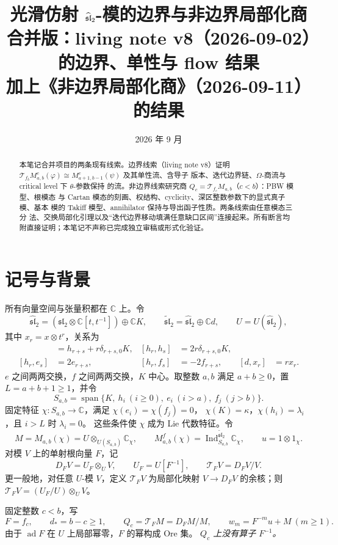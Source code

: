 \documentclass[UTF8,11pt]{ctexart}
\title{光滑仿射 \(\slh\)-模的边界与非边界局部化商\\
\large 合并版：living note v8（2026-09-02）的边界、单性与 flow 结果\\
加上《非边界局部化商》（2026-09-11）的结果}
\author{}
\date{2026 年 9 月}
\newcommand{\C}{\mathbb C}
\newcommand{\slc}{\mathfrak{sl}_2}
\newcommand{\slh}{\widehat{\mathfrak{sl}}_2}
\newcommand{\slt}{\widetilde{\mathfrak{sl}}_2}
\newcommand{\ad}{\operatorname{ad}}
\newcommand{\Ind}{\operatorname{Ind}}
\newcommand{\Span}{\operatorname{span}}
\newcommand{\T}{\mathcal T}
\theoremstyle{definition}
\begin{document}
\maketitle

\begin{abstract}
本笔记合并项目的两条现有线索。边界线索（living note v8）证明
\(\T_{f_b}M^c_{a,b}(\varphi)\cong M^c_{a+1,b-1}(\psi)\) 及其单性流、含导子
版本、迭代边界链、\(\Omega\)-商流与 critical level 下 \(\theta\)-参数保持
的流。非边界线索研究商 \(Q_c=\T_{f_c}M_{a,b}\)（\(c<b\)）：PBW 模型、根模态
与 Cartan 模态的刻画、权结构、cyclicity、深区整数参数下的显式真子模、基本
模的 Takiff 模型、annihilator 保持与导出函子性质。两条线索由任意模态三分
法、交换局部化引理以及“迭代边界移动填满任意缺口区间”连接起来。所有断言均
附直接证明；本笔记不声称已完成独立审稿或形式化验证。
\end{abstract}

\section{记号与背景}\label{sec:setup}

所有向量空间与张量积都在 \(\C\) 上。令
\[
\slh=(\slc\otimes\C[t,t^{-1}])\oplus\C K,\qquad
\slt=\slh\oplus\C d,\qquad U=U(\slh),
\]
其中 \(x_r=x\otimes t^r\)，关系为
\begin{align*}
[e_r,f_s]&=h_{r+s}+r\delta_{r+s,0}K,&
[h_r,h_s]&=2r\delta_{r+s,0}K,\\
[h_r,e_s]&=2e_{r+s},&
[h_r,f_s]&=-2f_{r+s},&
[d,x_r]&=rx_r.
\end{align*}
\(e\) 之间两两交换，\(f\) 之间两两交换，\(K\) 中心。取整数 \(a,b\) 满足
\(a+b\ge0\)，置 \(L=a+b+1\ge1\)，并令
\[
S_{a,b}=\Span\{K,\ h_i\ (i\ge0),\ e_i\ (i>a),\ f_j\ (j>b)\}.
\]
固定特征 \(\chi:S_{a,b}\to\C\)，满足 \(\chi(e_i)=\chi(f_j)=0\)，
\(\chi(K)=\kappa\)，\(\chi(h_i)=\lambda_i\)，且 \(i>L\) 时 \(\lambda_i=0\)。
这些条件使 \(\chi\) 成为 Lie 代数特征。令
\[
M=M_{a,b}(\chi)=U\otimes_{U(S_{a,b})}\C_\chi,\qquad
M^f_{a,b}(\chi)=\Ind_{S_{a,b}}^{\slt}\C_\chi,\qquad u=1\otimes1_\chi.
\]
对模 \(V\) 上的单射根向量 \(F\)，记
\[
D_FV=U_F\otimes_UV,\qquad U_F=U[F^{-1}],\qquad
\T_FV=D_FV/V.
\]
更一般地，对任意 \(U\)-模 \(V\)，定义 \(\T_FV\) 为局部化映射
\(V\to D_FV\) 的余核；则 \(\T_FV=(U_F/U)\otimes_UV\)。

固定整数 \(c<b\)，写
\[
F=f_c,\qquad d_*=b-c\ge1,\qquad
Q_c=\T_FM=D_FM/M,\qquad w_m=F^{-m}u+M\ (m\ge1).
\]
由于 \(\ad F\) 在 \(U\) 上局部幂零，\(F\) 的幂构成 Ore 集。
\emph{\(Q_c\) 上没有算子 \(F^{-1}\)。}
\end{document}
